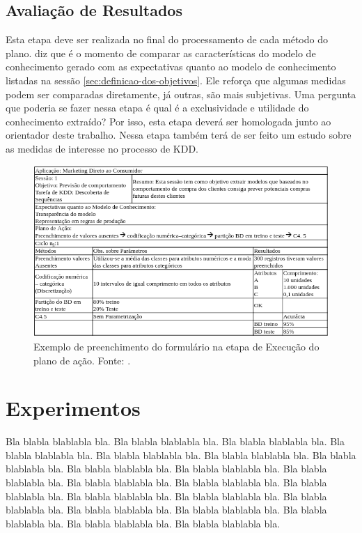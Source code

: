 \documentclass[diss,capa]{texufpel}
\begin{document}
    \section{Avaliação de Resultados}
    \label{sec:avaliacao-de-resultados}
    
    Esta etapa deve ser realizada no final do processamento de cada método do plano. \citet{goldschmidt2015data} diz que é o momento de comparar as características do modelo de conhecimento gerado com as expectativas quanto ao modelo de conhecimento listadas na sessão \ref{sec:definicao-dos-objetivos}. Ele reforça que algumas medidas podem ser comparadas diretamente, já outras, são mais subjetivas. Uma pergunta que poderia se fazer nessa etapa é qual é a exclusividade e utilidade do conhecimento extraído? Por isso, esta etapa deverá ser homologada junto ao orientador deste trabalho. Nessa etapa também terá de ser feito um estudo sobre as medidas de interesse no processo de KDD.
    
    \begin{figure}[htbp]
      \centering \includegraphics[scale=.4]{imagens/formulario-etapa-execucao-dos-planos-de-acao.png}
      \caption{Exemplo de preenchimento do formulário na etapa de Execução do plano de ação. Fonte: \cite{goldschmidt2015data}.}
      \label{fig:formulario-etapa-execucao-dos-planos-de-acao}
    \end{figure}

\chapter{Experimentos}

  Bla blabla blablabla bla.  Bla blabla blablabla bla.  Bla blabla
  blablabla bla.  Bla blabla blablabla bla.  Bla blabla blablabla bla.
  Bla blabla blablabla bla.  Bla blabla blablabla bla.  Bla blabla
  blablabla bla.  Bla blabla blablabla bla.  Bla blabla blablabla bla.
  Bla blabla blablabla bla.  Bla blabla blablabla bla.  Bla blabla
  blablabla bla.  Bla blabla blablabla bla.  Bla blabla blablabla bla.
  Bla blabla blablabla bla.  Bla blabla blablabla bla.  Bla blabla
  blablabla bla.  Bla blabla blablabla bla.  Bla blabla blablabla bla.
  Bla blabla blablabla bla.
\end{document}

